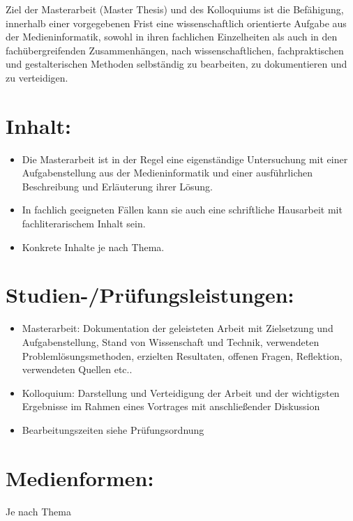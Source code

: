 Ziel der Masterarbeit (Master Thesis) und des Kolloquiums ist die
Befähigung, innerhalb einer vorgegebenen Frist eine wissenschaftlich
orientierte Aufgabe aus der Medieninformatik, sowohl in ihren fachlichen
Einzelheiten als auch in den fachübergreifenden Zusammenhängen, nach
wissenschaftlichen, fachpraktischen und gestalterischen Methoden
selbständig zu bearbeiten, zu dokumentieren und zu verteidigen.

\section*{Inhalt:}\label{inhalt-1}

\begin{itemize}
\tightlist
\item
  Die Masterarbeit ist in der Regel eine eigenständige Untersuchung mit
  einer Aufgabenstellung aus der Medieninformatik und einer
  ausführlichen Beschreibung und Erläuterung ihrer Lösung.
\item
  In fachlich geeigneten Fällen kann sie auch eine schriftliche
  Hausarbeit mit fachliterarischem Inhalt sein.
\item
  Konkrete Inhalte je nach Thema.
\end{itemize}

\section*{Studien-/Prüfungsleistungen:}\label{studien-pruxfcfungsleistungen-1}

\begin{itemize}
\tightlist
\item
  Masterarbeit: Dokumentation der geleisteten Arbeit mit Zielsetzung und
  Aufgabenstellung, Stand von Wissenschaft und Technik, verwendeten
  Problemlösungsmethoden, erzielten Resultaten, offenen Fragen,
  Reflektion, verwendeten Quellen etc..
\item
  Kolloquium: Darstellung und Verteidigung der Arbeit und der
  wichtigsten Ergebnisse im Rahmen eines Vortrages mit anschließender
  Diskussion
\item
  Bearbeitungszeiten siehe Prüfungsordnung
\end{itemize}

\section*{Medienformen:}\label{medienformen-1}

Je nach Thema

